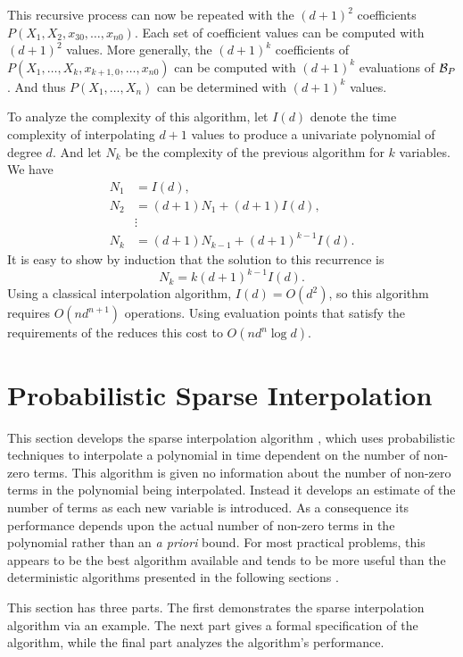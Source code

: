 This recursive process can now be repeated with the $(d+1)^2$
coefficients $P(X_1, X_2, x_{30}, \ldots, x_{n0})$.  Each set of
coefficient values can be computed with $(d+1)^2$ values.  More
generally, the $(d+1)^k$ coefficients of $P(X_1, \ldots, X_k,
x_{k+1,0}, \ldots, x_{n0})$ can be computed with $(d+1)^k$ evaluations
of ${\cal B}_P$.  And thus $P(X_1, \ldots, X_n)$ can be determined
with $(d+1)^k$ values.

To analyze the complexity of this algorithm, let $I(d)$ denote the
time complexity of interpolating $d+1$ values to produce a univariate
polynomial of degree $d$.  And let $N_k$ be the complexity of the
previous algorithm for $k$ variables.  We have
\[
\begin{aligned}
N_1 & = I(d), \\
N_2 & = (d + 1) N_1 + (d+1)I(d), \\
& \vdots \\
N_k & = (d+1) N_{k-1} + (d+1)^{k-1} I(d).
\end{aligned}
\]
It is easy to show by induction that the solution to this recurrence
is
\[
N_k = k(d+1)^{k-1} I(d).
\]
Using a classical interpolation algorithm, $I(d) = O(d^2)$, so this
algorithm requires $O(n d^{n+1})$ operations.  Using evaluation points
that satisfy the requirements of the 
reduces this cost to $O(n d^n \log d)$.

\section{Probabilistic Sparse Interpolation}
\label{Interp:PSparse:Sec}

This section develops the sparse interpolation algorithm
\cite{Zippel1990-ab}, which uses probabilistic techniques to interpolate a 
polynomial in time dependent on the number of non-zero terms.  This 
algorithm is given no information about the number of non-zero terms in 
the polynomial being interpolated. Instead it develops an estimate of the 
number of terms as each new variable is introduced.  As a consequence its 
performance depends upon the actual number of non-zero terms in the 
polynomial rather than an {\em a priori} bound.  For most practical 
problems, this appears to be the best algorithm available and tends to be 
more useful than the deterministic algorithms presented in the following 
sections \cite{Manocha1991-iq}.

This section has three parts.  The first demonstrates the sparse 
interpolation algorithm via an example. The next part gives a formal 
specification of the algorithm, while the final part analyzes the 
algorithm's performance. 


